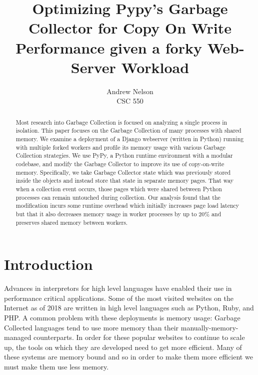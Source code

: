 \documentclass{article}
\begin{document}
\begin{titlepage}
    \title{Optimizing Pypy's Garbage Collector for Copy On Write Performance given a forky Web-Server Workload}
    \author{Andrew Nelson\\CSC 550}

    \maketitle

    \begin{abstract}
        Most research into Garbage Collection is focused on analyzing a single process in isolation.  This paper focuses on the Garbage Collection of many processes with shared memory.  We examine a deployment of a Django webserver (written in Python) running with multiple forked workers and profile its memory usage with various Garbage Collection strategies.  We use PyPy, a Python runtime environment with a modular codebase, and modify the Garbage Collector to improve its use of copy-on-write memory. Specifically, we take Garbage Collector state which was previously stored inside the objects and instead store that state in separate memory pages.  That way when a collection event occurs, those pages which were shared between Python processes can remain untouched during collection.  Our analysis found that the modification incurs some runtime overhead which initially increases page load latency but that it also decreases memory usage in worker processes by up to 20\% and preserves shared memory between workers.  
    \end{abstract}
\end{titlepage}

\newpage

\tableofcontents

\newpage
{}
\twocolumn


\section{Introduction}
Advances in interpretors for high level languages have enabled their use in performance critical applications.  Some of the most visited websites on the Internet as of 2018 are written in high level languages such as Python, Ruby, and PHP.  A common problem with these deployments is memory usage: Garbage Collected languages tend to use more memory than their manually-memory-managed counterparts. In order for these popular websites to continue to scale up, the tools on which they are developed need to get more efficient.  Many of these systems are memory bound and so in order to make them more efficient we must make them use less memory.  
\end{document}
